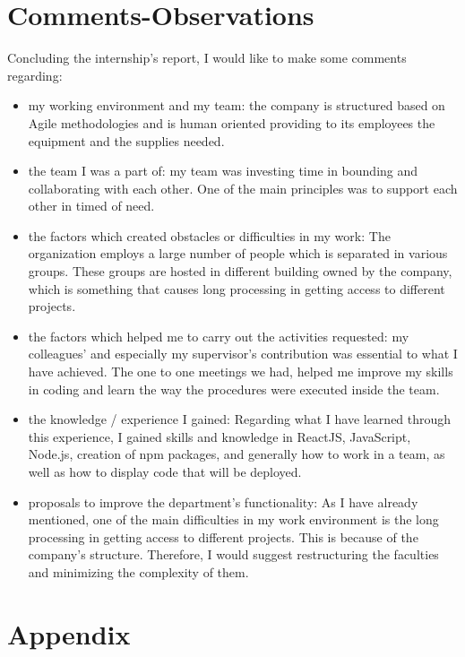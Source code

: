 
\chapter{Comments-Observations} %

\label{Chapter7}

Concluding the internship's report, I would like to make some comments regarding:

\begin{itemize}

	\item my working environment and my team: the company is structured based on Agile methodologies and is human oriented providing to its employees the equipment and the supplies needed.
	\item the team I was a part of: my team was investing time in bounding and collaborating with each other. One of the main principles was to support each other in timed of need.
	\item the factors which created obstacles or difficulties in my work: The organization employs a large number of people which is separated in various groups. These groups are hosted in different building owned by the company, which is something that causes long processing in getting access to different projects. 
	\item the factors which helped me to carry out the activities requested: my colleagues' and especially my supervisor's contribution was essential to what I have achieved. The one to one meetings we had, helped me improve my skills in coding and learn the way the procedures were executed inside the team.
	\item the knowledge / experience I gained: Regarding what I have learned through this experience, I gained skills and knowledge in ReactJS, JavaScript, Node.js, creation of npm packages, and generally how to work in a team, as well as how to display code that will be deployed.
	\item proposals to improve the department's functionality: As I have already mentioned, one of the main difficulties in my work environment is the long processing in getting access to different projects. This is because of the company's structure. Therefore, I would suggest restructuring the faculties and minimizing the complexity of them.
\end{itemize}


\chapter{Appendix}

